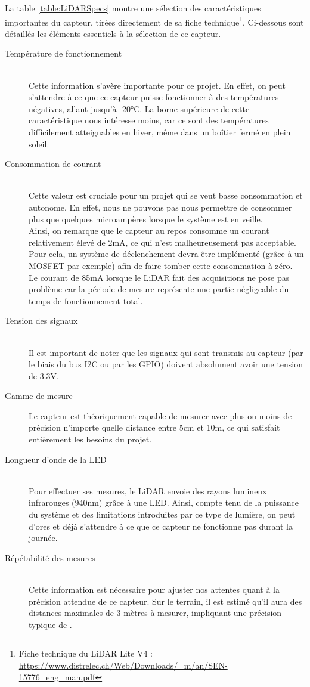 La table \ref{table:LiDARSpecs} montre une sélection des caractéristiques importantes du capteur, tirées
directement de sa fiche technique\footnote{Fiche technique du LiDAR Lite V4 :
\url{https://www.distrelec.ch/Web/Downloads/_m/an/SEN-15776_eng_man.pdf}}.
Ci-dessous sont détaillés les éléments essentiels à la sélection de ce capteur.

\begin{description}
    \item[Température de fonctionnement] \hfill \\ 
    Cette information s'avère importante pour ce projet. En
    effet, on peut s'attendre à ce que ce capteur puisse fonctionner à des températures négatives,
    allant jusqu'à -20°C. La borne supérieure de cette caractéristique nous intéresse moins, car
    ce sont des températures difficilement atteignables en hiver, même dans un boîtier fermé en 
    plein soleil.
    \item[Consommation de courant] \hfill \\ 
    Cette valeur est cruciale pour un projet qui se veut basse
    consommation et autonome. En effet, nous ne pouvons pas nous permettre de consommer plus que
    quelques microampères lorsque le système est en veille.\\
    Ainsi, on remarque que le capteur au repos consomme un courant relativement élevé de 2mA, ce
    qui n'est malheureusement pas acceptable. Pour cela, un système de déclenchement devra être
    implémenté (grâce à un MOSFET par exemple) afin de faire tomber cette consommation à zéro.\\
    Le courant de 85mA lorsque le LiDAR fait des acquisitions ne pose pas problème car la période 
    de mesure représente une partie négligeable du temps de fonctionnement total.
    \item[Tension des signaux] \hfill \\ 
    Il est important de noter que les signaux qui sont transmis au
    capteur (par le biais du bus I2C ou par les GPIO) doivent absolument avoir une tension de 3.3V.
    \item[Gamme de mesure] Le capteur est théoriquement capable de mesurer avec plus ou moins de
    précision n'importe quelle distance entre 5cm et 10m, ce qui satisfait entièrement les besoins
    du projet.
    \item[Longueur d'onde de la LED] \hfill \\ 
    Pour effectuer ses mesures, le LiDAR envoie des rayons lumineux
    infrarouges (940nm) grâce à une LED. Ainsi, compte tenu de la puissance du système et des limitations
    introduites par ce type de lumière, on peut d'ores et déjà s'attendre à ce que ce capteur ne
    fonctionne pas durant la journée.
    \item[Répétabilité des mesures] \hfill \\ 
    Cette information est nécessaire pour ajuster nos attentes quant
    à la précision attendue de ce capteur. Sur le terrain, il est estimé qu'il aura des distances 
    maximales de 3 mètres à mesurer, impliquant une précision typique de \textpm 2cm. 
\end{description}

